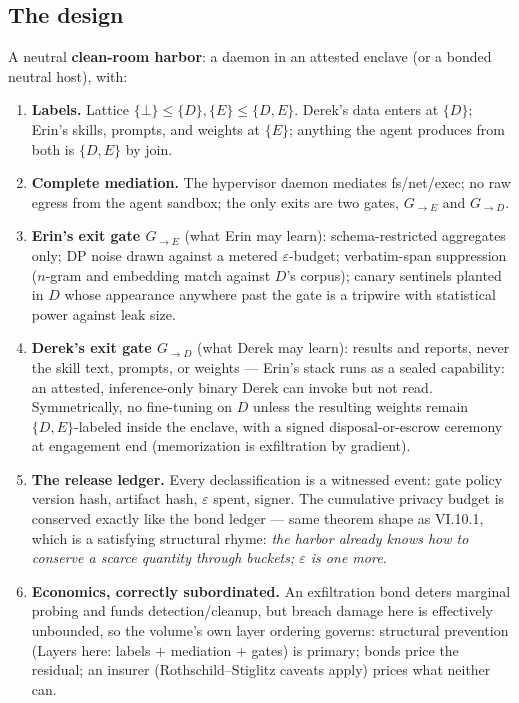 \documentclass[11pt,a4paper]{article}
\theoremstyle{definition}
\theoremstyle{remark}
\begin{document}
\subsection{The design}
A neutral \textbf{clean-room harbor}: a daemon in an attested enclave (or a bonded neutral host), with:
\begin{enumerate}[leftmargin=1.4em,itemsep=1pt]
\item \textbf{Labels.} Lattice $\{\bot\} \le \{D\}, \{E\} \le \{D,E\}$. Derek's data enters at $\{D\}$; Erin's skills, prompts, and weights at $\{E\}$; anything the agent produces from both is $\{D,E\}$ by join.
\item \textbf{Complete mediation.} The hypervisor daemon mediates fs/net/exec; no raw egress from the agent sandbox; the only exits are two gates, $G_{\to E}$ and $G_{\to D}$.
\item \textbf{Erin's exit gate $G_{\to E}$} (what Erin may learn): schema-restricted aggregates only; DP noise drawn against a metered $\varepsilon$-budget; verbatim-span suppression ($n$-gram and embedding match against $D$'s corpus); canary sentinels planted in $D$ whose appearance anywhere past the gate is a tripwire with statistical power against leak size.
\item \textbf{Derek's exit gate $G_{\to D}$} (what Derek may learn): results and reports, never the skill text, prompts, or weights --- Erin's stack runs as a sealed capability: an attested, inference-only binary Derek can invoke but not read. Symmetrically, no fine-tuning on $D$ unless the resulting weights remain $\{D,E\}$-labeled inside the enclave, with a signed disposal-or-escrow ceremony at engagement end (memorization is exfiltration by gradient).
\item \textbf{The release ledger.} Every declassification is a witnessed event: gate policy version hash, artifact hash, $\varepsilon$ spent, signer. The cumulative privacy budget is conserved exactly like the bond ledger --- same theorem shape as VI.10.1, which is a satisfying structural rhyme: \emph{the harbor already knows how to conserve a scarce quantity through buckets; $\varepsilon$ is one more.}
\item \textbf{Economics, correctly subordinated.} An exfiltration bond deters marginal probing and funds detection/cleanup, but breach damage here is effectively unbounded, so the volume's own layer ordering governs: structural prevention (Layers here: labels $+$ mediation $+$ gates) is primary; bonds price the residual; an insurer (Rothschild--Stiglitz caveats apply) prices what neither can.
\end{enumerate}
\end{document}
